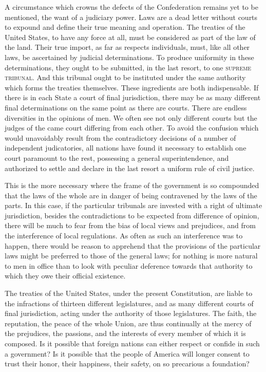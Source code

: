 A circumstance which crowns the defects of the Confederation remains yet to be mentioned, the want of a judiciary power. Laws are a dead letter without courts to expound and define their true meaning and operation. The treaties of the United States, to have any force at all, must be considered as part of the law of the land. Their true import, as far as respects individuals, must, like all other laws, be ascertained by judicial determinations. To produce uniformity in these determinations, they ought to be submitted, in the last resort, to one \textsc{supreme tribunal}. And this tribunal ought to be instituted under the same authority which forms the treaties themselves. These ingredients are both indispensable. If there is in each State a court of final jurisdiction, there may be as many different final determinations on the same point as there are courts. There are endless diversities in the opinions of men. We often see not only different courts but the judges of the came court differing from each other. To avoid the confusion which would unavoidably result from the contradictory decisions of a number of independent judicatories, all nations have found it necessary to establish one court paramount to the rest, possessing a general superintendence, and authorized to settle and declare in the last resort a uniform rule of civil justice.

This is the more necessary where the frame of the government is so compounded that the laws of the whole are in danger of being contravened by the laws of the parts. In this case, if the particular tribunals are invested with a right of ultimate jurisdiction, besides the contradictions to be expected from difference of opinion, there will be much to fear from the bias of local views and prejudices, and from the interference of local regulations. As often as such an interference was to happen, there would be reason to apprehend that the provisions of the particular laws might be preferred to those of the general laws; for nothing is more natural to men in office than to look with peculiar deference towards that authority to which they owe their official existence.

The treaties of the United States, under the present Constitution, are liable to the infractions of thirteen different legislatures, and as many different courts of final jurisdiction, acting under the authority of those legislatures. The faith, the reputation, the peace of the whole Union, are thus continually at the mercy of the prejudices, the passions, and the interests of every member of which it is composed. Is it possible that foreign nations can either respect or confide in such a government? Is it possible that the people of America will longer consent to trust their honor, their happiness, their safety, on so precarious a foundation?

